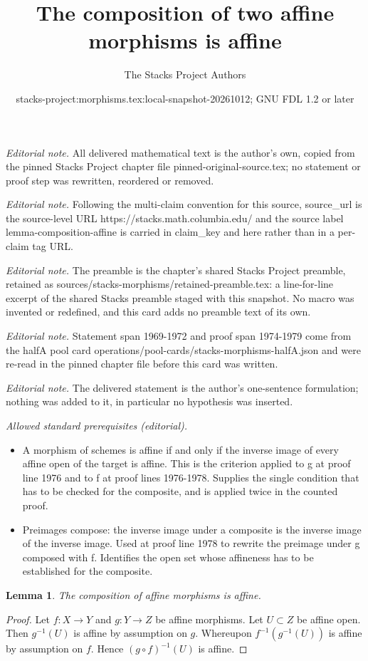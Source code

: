 \documentclass[10pt,a4paper]{amsart}
\title{The composition of two affine morphisms is affine}
\author{The Stacks Project Authors}
\date{stacks-project:morphisms.tex:local-snapshot-20261012; GNU FDL 1.2 or later}
\theoremstyle{plain}
\newtheorem{lemma}[subsection]{Lemma}
\theoremstyle{definition}
\theoremstyle{remark}
\numberwithin{equation}{subsection}
\begin{document}
\maketitle
\noindent\textit{Editorial note.} All delivered mathematical text is the author's own, copied from the pinned Stacks Project chapter file pinned-original-source.tex; no statement or proof step was rewritten, reordered or removed.\par\medskip
\noindent\textit{Editorial note.} Following the multi-claim convention for this source, source\_url is the source-level URL https://stacks.math.columbia.edu/ and the source label lemma-composition-affine is carried in claim\_key and here rather than in a per-claim tag URL.\par\medskip
\noindent\textit{Editorial note.} The preamble is the chapter's shared Stacks Project preamble, retained as sources/stacks-morphisms/retained-preamble.tex: a line-for-line excerpt of the shared Stacks preamble staged with this snapshot. No macro was invented or redefined, and this card adds no preamble text of its own.\par\medskip
\noindent\textit{Editorial note.} Statement span 1969-1972 and proof span 1974-1979 come from the halfA pool card operations/pool-cards/stacks-morphisms-halfA.json and were re-read in the pinned chapter file before this card was written.\par\medskip
\noindent\textit{Editorial note.} The delivered statement is the author's one-sentence formulation; nothing was added to it, in particular no hypothesis was inserted.\par\medskip
\noindent\textit{Allowed standard prerequisites (editorial).}\begin{itemize}
\item A morphism of schemes is affine if and only if the inverse image of every affine open of the target is affine. This is the criterion applied to g at proof line 1976 and to f at proof lines 1976-1978. Supplies the single condition that has to be checked for the composite, and is applied twice in the counted proof.
\item Preimages compose: the inverse image under a composite is the inverse image of the inverse image. Used at proof line 1978 to rewrite the preimage under g composed with f. Identifies the open set whose affineness has to be established for the composite.
\end{itemize}\medskip
\begin{lemma}
\label{lemma-composition-affine}
The composition of affine morphisms is affine.
\end{lemma}

\begin{proof}
Let $f : X \to Y$ and $g : Y \to Z$ be affine morphisms.
Let $U \subset Z$ be affine open. Then $g^{-1}(U)$ is affine
by assumption on $g$. Whereupon $f^{-1}(g^{-1}(U))$ is affine
by assumption on $f$. Hence $(g \circ f)^{-1}(U)$ is affine.
\end{proof}
\end{document}
